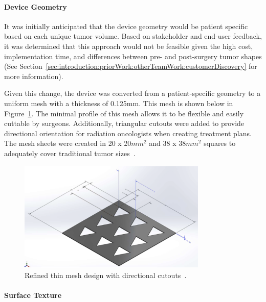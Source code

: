 \paragraph*{Device Geometry\label{introduction:priorWork:otherTeamWork:deviceDesign:deviceGeometry}}

It was initially anticipated that the device geometry would be patient specific based on each unique tumor volume. Based on stakeholder and end-user feedback, it was determined that this approach would not be feasible given the high cost, implementation time, and differences between pre- and post-surgery tumor shapes (See Section~\ref{sec:introduction:priorWork:otherTeamWork:customerDiscovery} for more information).

Given this change, the device was converted from a patient-specific geometry to a uniform mesh with a thickness of 0.125mm. This mesh is shown below in Figure~\ref{fig:introduction:initialThinMeshDesign}. The minimal profile of this mesh allows it to be flexible and easily cuttable by surgeons. Additionally, triangular  cutouts were added to provide directional orientation for radiation oncologists when creating treatment plans. The mesh sheets were created in 20 x 20$mm^2$ and 38 x 38$mm^2$ squares to adequately cover traditional tumor sizes~\cite{RefWorks:RefID:371-bakhtardesign}.

\begin{figure}[h!]
        \centering
        \includegraphics[width=0.8\textwidth]{../figs/introduction/thin_flat_mesh_design_with_cutouts.png}
        \caption{Refined thin mesh design with directional cutouts~\cite{RefWorks:RefID:371-bakhtardesign}.}
        \label{fig:introduction:initialThinMeshDesign}
\end{figure}

\paragraph*{Surface Texture\label{introduction:priorWork:otherTeamWork:deviceDesign:surfaceTexture}}


